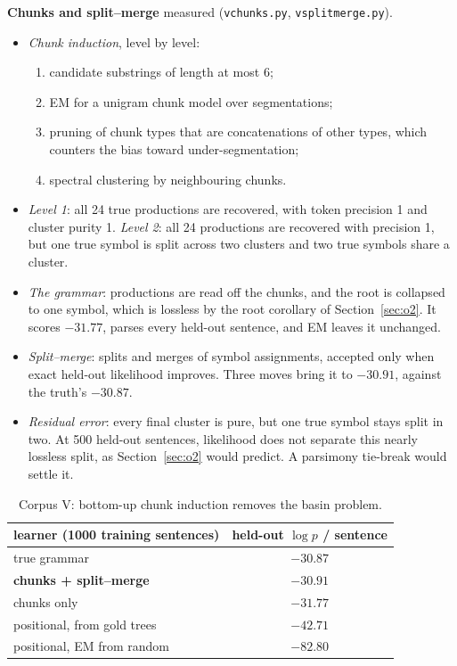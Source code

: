 \documentclass[11pt]{article}
\theoremstyle{definition}
\theoremstyle{remark}
\newcommand{\st}[1]{\textsf{\small\color{gray}#1}}
\begin{document}
\noindent\textbf{Chunks and split--merge} \st{measured} (\texttt{vchunks.py}, \texttt{vsplitmerge.py}).
\begin{itemize}
  \item \emph{Chunk induction}, level by level:
  \begin{enumerate}
    \item candidate substrings of length at most 6;
    \item EM for a unigram chunk model over segmentations;
    \item pruning of chunk types that are concatenations of other types, which counters the bias toward under-segmentation;
    \item spectral clustering by neighbouring chunks.
  \end{enumerate}
  \item \emph{Level 1}: all 24 true productions are recovered, with token precision 1 and cluster purity 1. \emph{Level 2}: all 24 productions are recovered with precision 1, but one true symbol is split across two clusters and two true symbols share a cluster.
  \item \emph{The grammar}: productions are read off the chunks, and the root is collapsed to one symbol, which is lossless by the root corollary of Section~\ref{sec:o2}. It scores $-31.77$, parses every held-out sentence, and EM leaves it unchanged.
  \item \emph{Split--merge}: splits and merges of symbol assignments, accepted only when exact held-out likelihood improves. Three moves bring it to $-30.91$, against the truth's $-30.87$.
  \item \emph{Residual error}: every final cluster is pure, but one true symbol stays split in two. At 500 held-out sentences, likelihood does not separate this nearly lossless split, as Section~\ref{sec:o2} would predict. A parsimony tie-break would settle it.
\end{itemize}
\begin{table}[!htbp]\centering\small
\begin{tabular}{lc}
\toprule
learner (1000 training sentences) & held-out $\log p$ / sentence\\
\midrule
true grammar & $-30.87$\\
\textbf{chunks + split--merge} & $\mathbf{-30.91}$\\
chunks only & $-31.77$\\
positional, from gold trees & $-42.71$\\
positional, EM from random & $-82.80$\\
\bottomrule
\end{tabular}
\caption{Corpus V: bottom-up chunk induction removes the basin problem.}
\end{table}
\end{document}
